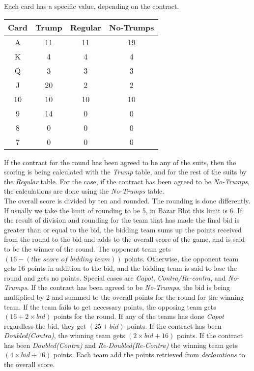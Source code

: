 Each card has a specific value, depending on the contract.
\begin{center}
    \begin{tabular}{|c|c|c|c|}
    \hline
    \textbf{Card} & \textbf{Trump} & \textbf{Regular} & \textbf{No-Trumps}\\
    \hline
    A & 11 & 11 & 19\\
    \hline
    K & 4 & 4 & 4\\
    \hline
    Q & 3 & 3 & 3\\
    \hline
    J & 20 & 2 & 2\\
    \hline
    10 & 10 & 10 & 10\\
    \hline
    9 & 14 & 0 & 0\\
    \hline
    8 & 0 & 0 & 0\\
    \hline
    7 & 0 & 0 & 0\\
    \hline
\end{tabular}
\end{center}
If the contract for the round has been agreed to be any of the suits, then the scoring is being calculated with the \textit{Trump} table, and for the rest of the suits by the \textit{Regular} table.
For the case, if the contract has been agreed to be \textit{No-Trumps}, the calculations are done using the \textit{No-Trumps} table.\\

The overall score is divided by ten and rounded.
The rounding is done differently.
If usually we take the limit of rounding to be 5, in Bazar Blot this limit is 6.
If the result of division and rounding for the team that has made the final bid is greater than or equal to the bid, the bidding team sums up the points received from the round to the bid and adds to the overall score of the game, and is said to be the winner of the round.
The opponent team gets $(16 - (\textit{the score of bidding team}))$ points.
Otherwise, the opponent team gets 16 points in addition to the bid, and the bidding team is said to lose the round and gets no points.
Special cases are \textit{Capot}, \textit{Contra/Re-contra}, and \textit{No-Trumps}.
If the contract has been agreed to be \textit{No-Trumps}, the bid is being multiplied by 2 and summed to the overall points for the round for the winning team.
If the team fails to get necessary points, the opposing team gets $(16 + 2 \times bid)$ points for the round.
If any of the teams has done \textit{Capot} regardless the bid, they get $(25+bid)$ points.
If the contract has been \textit{Doubled(Contra)}, the winning team gets $(2\times bid + 16)$ points.
If the contract has been \textit{Doubled(Contra)} and \textit{Re-Doubled(Re-Contra)} the winning team gets $(4\times bid + 16)$ points.
Each team add the points retrieved from \textit{declarations} to the overall score.